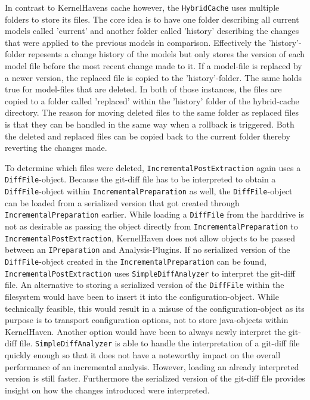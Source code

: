 \documentclass[a4paper]{article}
\begin{document}
 In contrast to KernelHavens cache however, the \texttt{Hybrid\-Cache} uses multiple folders to store its files. The core idea is to have one folder describing all current models called 'current' and another folder called 'history' describing the changes that were applied to the previous models in comparison. Effectively the 'history'-folder repesents a change history of the models but only stores the version of each model file before the most recent change made to it. 
 If a model-file is replaced by a newer version, the replaced file is copied to the 'history'-folder. The same holds true for model-files that are deleted. In both of those instances, the files are copied to a folder called 'replaced' within the 'history' folder of the hybrid-cache directory. The reason for moving deleted files to the same folder as replaced files is that they can be handled in the same way when a rollback is triggered. Both the deleted and replaced files can be copied back to the current folder thereby reverting the changes made.
 
To determine which files were deleted, \texttt{Incremental\-Post\-Extraction} again uses a \texttt{DiffFile}-object. Because the git-diff file has to be interpreted to obtain a \texttt{DiffFile}-object within \texttt{Incremental\-Preparation} as well, the \texttt{DiffFile}-object can be loaded from a serialized version that got created through \texttt{Incremental\-Preparation} earlier. While loading a \texttt{DiffFile} from the harddrive is not as desirable as passing the object directly from \texttt{Incremental\-Preparation} to \texttt{Incremental\-Post\-Extraction}, KernelHaven does not allow objects to be passed between an \texttt{IPreparation} and Analysis-Plugins. If no serialized version of the \texttt{DiffFile}-object created in the \texttt{Incremental\-Preparation} can be found, \texttt{Incremental\-Post\-Extraction} uses \texttt{Simple\-Diff\-Analyzer} to interpret the git-diff file. An alternative to storing a serialized version of the \texttt{DiffFile} within the filesystem would have been to insert it into the configuration-object. While technically feasible, this would result in a misuse of the configuration-object as its purpose is to transport configuration options, not to store java-objects within KernelHaven. Another option would have been to always newly interpret the git-diff file. \texttt{Simple\-Diff\-Analyzer} is able to handle the interpretation of a git-diff file quickly enough so that it does not have a noteworthy impact on the overall performance of an incremental analysis. However, loading an already interpreted version is still faster. Furthermore the serialized version of the git-diff file provides insight on how the changes introduced were interpreted.
 
\end{document}
